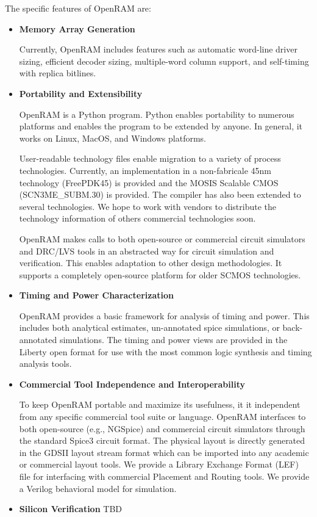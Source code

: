 The specific features of OpenRAM are:
\begin{itemize}

\item \textbf{Memory Array Generation} 

  Currently, OpenRAM includes features such as automatic word-line
  driver sizing, efficient decoder sizing, multiple-word column
  support, and self-timing with replica bitlines.

\item \textbf{Portability and Extensibility} 

  OpenRAM is a Python program. Python enables portability to numerous
  platforms and enables the program to be extended by anyone. In
  general, it works on Linux, MacOS, and Windows platforms.

  User-readable technology files enable migration to a variety of
  process technologies. Currently, an implementation in a
  non-fabricale 45nm technology (FreePDK45) is provided and the MOSIS
  Scalable CMOS (SCN3ME\_SUBM.30) is provided. The compiler has also
  been extended to several technologies. We hope to work with vendors
  to distribute the technology information of others commercial
  technologies soon.

  OpenRAM makes calls to both open-source or commercial circuit
  simulators and DRC/LVS tools in an abstracted way for circuit
  simulation and verification. This enables adaptation to other design
  methodologies. It supports a completely open-source
  platform for older SCMOS technologies.

\item \textbf{Timing and Power Characterization}

  OpenRAM provides a basic framework for analysis of timing and power.
  This includes both analytical estimates, un-annotated spice
  simulations, or back-annotated simulations.  The timing and power
  views are provided in the Liberty open format for use with the most
  common logic synthesis and timing analysis tools.

\item \textbf{Commercial Tool Independence and Interoperability}

  To keep OpenRAM portable and maximize its usefulness, it it
  independent from any specific commercial tool suite or
  language. OpenRAM interfaces to both open-source (e.g., NGSpice) and
  commercial circuit simulators through the standard Spice3 circuit
  format. The physical layout is directly generated in the GDSII
  layout stream format which can be imported into any academic or
  commercial layout tools. We provide a Library Exchange Format (LEF)
  file for interfacing with commercial Placement and Routing tools.
  We provide a Verilog behavioral model for simulation.

\item \textbf{Silicon Verification} 
  TBD

\end{itemize}

